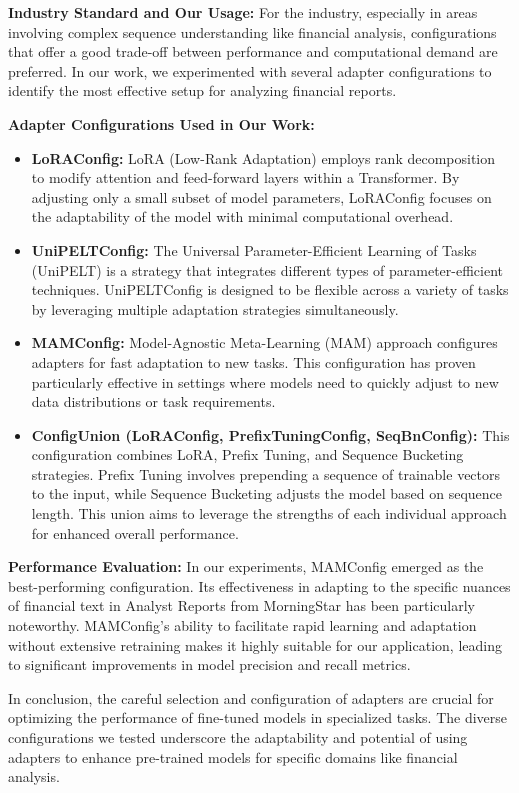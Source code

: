 \documentclass[conference]{IEEEtran}
\begin{document}
\textbf{Industry Standard and Our Usage:} For the industry, especially in areas involving complex sequence understanding like financial analysis, configurations that offer a good trade-off between performance and computational demand are preferred. In our work, we experimented with several adapter configurations to identify the most effective setup for analyzing financial reports.

\textbf{Adapter Configurations Used in Our Work:}
\begin{itemize}
    \item \textbf{LoRAConfig:} LoRA (Low-Rank Adaptation) employs rank decomposition to modify attention and feed-forward layers within a Transformer. By adjusting only a small subset of model parameters, LoRAConfig focuses on the adaptability of the model with minimal computational overhead.
    \item \textbf{UniPELTConfig:} The Universal Parameter-Efficient Learning of Tasks (UniPELT) is a strategy that integrates different types of parameter-efficient techniques. UniPELTConfig is designed to be flexible across a variety of tasks by leveraging multiple adaptation strategies simultaneously.
    \item \textbf{MAMConfig:} Model-Agnostic Meta-Learning (MAM) approach configures adapters for fast adaptation to new tasks. This configuration has proven particularly effective in settings where models need to quickly adjust to new data distributions or task requirements.
    \item \textbf{ConfigUnion (LoRAConfig, PrefixTuningConfig, SeqBnConfig):} This configuration combines LoRA, Prefix Tuning, and Sequence Bucketing strategies. Prefix Tuning involves prepending a sequence of trainable vectors to the input, while Sequence Bucketing adjusts the model based on sequence length. This union aims to leverage the strengths of each individual approach for enhanced overall performance.
\end{itemize}

\textbf{Performance Evaluation:} In our experiments, MAMConfig emerged as the best-performing configuration. Its effectiveness in adapting to the specific nuances of financial text in Analyst Reports from MorningStar has been particularly noteworthy. MAMConfig's ability to facilitate rapid learning and adaptation without extensive retraining makes it highly suitable for our application, leading to significant improvements in model precision and recall metrics.

In conclusion, the careful selection and configuration of adapters are crucial for optimizing the performance of fine-tuned models in specialized tasks. The diverse configurations we tested underscore the adaptability and potential of using adapters to enhance pre-trained models for specific domains like financial analysis.
\end{document}
